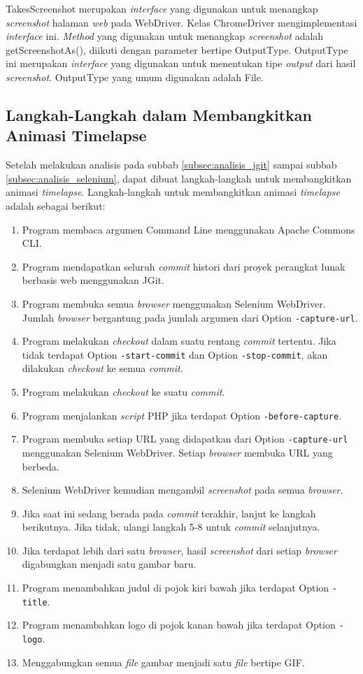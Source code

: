 TakesScreenshot merupakan \textit{interface} yang digunakan untuk menangkap \textit{screenshot} halaman \textit{web} pada WebDriver. Kelas ChromeDriver mengimplementasi \textit{interface} ini. \textit{Method} yang digunakan untuk menangkap \textit{screenshot} adalah getScreenshotAs(), diikuti dengan parameter bertipe OutputType. OutputType ini merupakan \textit{interface} yang digunakan untuk menentukan tipe \textit{output} dari hasil \textit{screenshot}. OutputType yang umum digunakan adalah File.    

\subsection{Langkah-Langkah dalam Membangkitkan Animasi Timelapse}
\label{subsec:langkah_animasi}
Setelah melakukan analisis pada subbab \ref{subsec:analisis_jgit} sampai subbab \ref{subsec:analisis_selenium}, dapat dibuat langkah-langkah untuk membangkitkan animasi \textit{timelapse}. Langkah-langkah untuk membangkitkan animasi \textit{timelapse} adalah sebagai berikut:\\
\begin{enumerate}
\item Program membaca argumen Command Line menggunakan Apache Commons CLI.
\item Program mendapatkan seluruh \textit{commit} histori dari proyek perangkat lunak berbasis web menggunakan JGit.
\item Program membuka semua \textit{browser} menggunakan Selenium WebDriver. Jumlah \textit{browser} bergantung pada jumlah argumen dari Option \texttt{-capture-url}.
\item Program melakukan \textit{checkout} dalam suatu rentang \textit{commit} tertentu. Jika tidak terdapat Option \texttt{-start-commit} dan Option \texttt{-stop-commit}, akan dilakukan \textit{checkout} ke semua \textit{commit}.
\item Program melakukan \textit{checkout} ke suatu \textit{commit}. 
\item Program menjalankan \textit{script} PHP jika terdapat Option \texttt{-before-capture}.
\item Program membuka setiap URL yang didapatkan dari Option \texttt{-capture-url} menggunakan Selenium WebDriver. Setiap \textit{browser} membuka URL yang berbeda.
\item Selenium WebDriver kemudian mengambil \textit{screenshot} pada semua \textit{browser}.
\item Jika saat ini sedang berada pada \textit{commit} terakhir, lanjut ke langkah berikutnya. Jika tidak, ulangi langkah 5-8 untuk \textit{commit} selanjutnya.
\item Jika terdapat lebih dari satu \textit{browser}, hasil \textit{screenshot} dari setiap \textit{browser} digabungkan menjadi satu gambar baru. 
\item Program menambahkan judul di pojok kiri bawah jika terdapat Option \texttt{-title}.
\item Program menambahkan logo di pojok kanan bawah jika terdapat Option \texttt{-logo}.  
\item Menggabungkan semua \textit{file} gambar menjadi satu \textit{file} bertipe GIF.
\end{enumerate}

